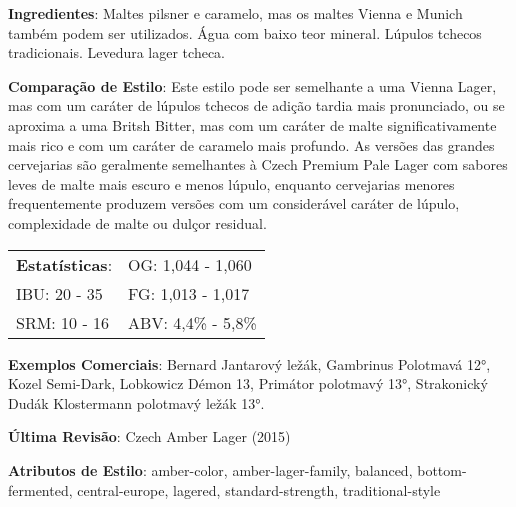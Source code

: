 \textbf{Ingredientes}: Maltes pilsner e caramelo, mas os maltes Vienna e Munich também podem ser utilizados. Água com baixo teor mineral. Lúpulos tchecos tradicionais. Levedura lager tcheca.

\textbf{Comparação de Estilo}: Este estilo pode ser semelhante a uma Vienna Lager, mas com um caráter de lúpulos tchecos de adição tardia mais pronunciado, ou se aproxima a uma Britsh Bitter, mas com um caráter de malte significativamente mais rico e com um caráter de caramelo mais profundo. As versões das grandes cervejarias são geralmente semelhantes à Czech Premium Pale Lager com sabores leves de malte mais escuro e menos lúpulo, enquanto cervejarias menores frequentemente produzem versões com um considerável caráter de lúpulo, complexidade de malte ou dulçor residual.

\begin{tabular}{@{}p{35mm}p{35mm}@{}}
  \textbf{Estatísticas}: & OG: 1,044 - 1,060 \\
  IBU: 20 - 35  & FG: 1,013 - 1,017  \\
  SRM: 10 - 16   & ABV: 4,4\% - 5,8\%
\end{tabular}

\textbf{Exemplos Comerciais}: Bernard Jantarový ležák, Gambrinus Polotmavá 12°, Kozel Semi-Dark, Lobkowicz Démon 13, Primátor polotmavý 13°, Strakonický Dudák Klostermann polotmavý ležák 13°.

\textbf{Última Revisão}: Czech Amber Lager (2015)

\textbf{Atributos de Estilo}: amber-color, amber-lager-family, balanced, bottom-fermented, central-europe, lagered, standard-strength, traditional-style